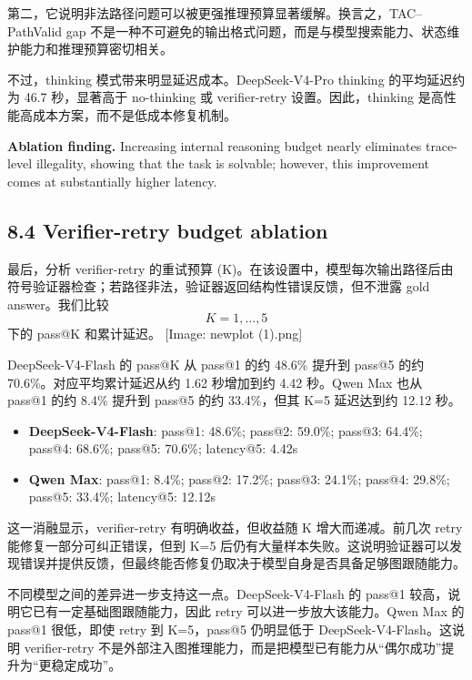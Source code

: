 \documentclass[
  11pt,
]{article}
\providecommand{\tightlist}{%
  \setlength{\itemsep}{0pt}\setlength{\parskip}{0pt}}
\begin{document}
第二，它说明非法路径问题可以被更强推理预算显著缓解。换言之，TAC--PathValid
gap
不是一种不可避免的输出格式问题，而是与模型搜索能力、状态维护能力和推理预算密切相关。

不过，thinking 模式带来明显延迟成本。DeepSeek-V4-Pro thinking
的平均延迟约为 46.7 秒，显著高于 no-thinking 或 verifier-retry
设置。因此，thinking 是高性能高成本方案，而不是低成本修复机制。

\textbf{Ablation finding.} Increasing internal reasoning budget nearly
eliminates trace-level illegality, showing that the task is solvable;
however, this improvement comes at substantially higher latency.

\subsection{8.4 Verifier-retry budget
ablation}\label{verifier-retry-budget-ablation}

最后，分析 verifier-retry 的重试预算
(K)。在该设置中，模型每次输出路径后由符号验证器检查；若路径非法，验证器返回结构性错误反馈，但不泄露
gold answer。我们比较 \[K=1,\dots,5\] 下的 pass@K 和累计延迟。 {[}Image:
newplot (1).png{]}

DeepSeek-V4-Flash 的 pass@K 从 pass@1 的约 48.6\% 提升到 pass@5 的约
70.6\%。对应平均累计延迟从约 1.62 秒增加到约 4.42 秒。Qwen Max 也从
pass@1 的约 8.4\% 提升到 pass@5 的约 33.4\%，但其 K=5 延迟达到约 12.12
秒。

\begin{itemize}
\tightlist
\item
  \textbf{DeepSeek-V4-Flash}: pass@1: 48.6\%; pass@2: 59.0\%; pass@3:
  64.4\%; pass@4: 68.6\%; pass@5: 70.6\%; latency@5: 4.42s
\item
  \textbf{Qwen Max}: pass@1: 8.4\%; pass@2: 17.2\%; pass@3: 24.1\%;
  pass@4: 29.8\%; pass@5: 33.4\%; latency@5: 12.12s
\end{itemize}

这一消融显示，verifier-retry 有明确收益，但收益随 K 增大而递减。前几次
retry 能修复一部分可纠正错误，但到 K=5
后仍有大量样本失败。这说明验证器可以发现错误并提供反馈，但最终能否修复仍取决于模型自身是否具备足够图跟随能力。

不同模型之间的差异进一步支持这一点。DeepSeek-V4-Flash 的 pass@1
较高，说明它已有一定基础图跟随能力，因此 retry
可以进一步放大该能力。Qwen Max 的 pass@1 很低，即使 retry 到 K=5，pass@5
仍明显低于 DeepSeek-V4-Flash。这说明 verifier-retry
不是外部注入图推理能力，而是把模型已有能力从``偶尔成功''提升为``更稳定成功''。
\end{document}
